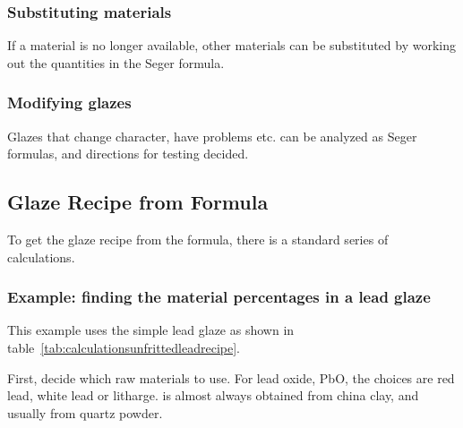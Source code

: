 \subsubsection{Substituting materials}
If a material is no longer available, other materials can be substituted by 
working out the quantities in the Seger formula.
\subsubsection{Modifying glazes}
Glazes that change character, have problems etc. can be analyzed as Seger 
formulas, and directions for testing decided.
\subsection{Glaze Recipe from Formula}
To get the glaze recipe from the formula, there is a standard series of 
calculations.
\subsubsection{Example: finding the material percentages in a lead glaze}
This example uses the simple lead glaze as shown in 
table~\ref{tab:calculationsunfrittedleadrecipe}.

First, decide which raw materials to use. For lead oxide, PbO, the choices are 
red lead, white lead or litharge.  is almost always obtained from 
china clay, and  usually from quartz powder.

